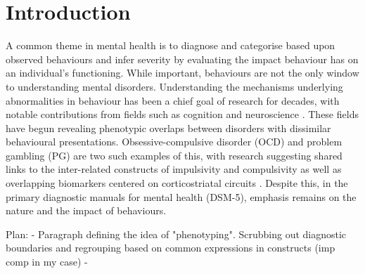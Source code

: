 \section{Introduction}

A common theme in mental health is to diagnose and categorise based upon observed behaviours and infer severity by evaluating the impact behaviour has on an individual's functioning. While important, behaviours are not the only window to understanding mental disorders. Understanding the mechanisms underlying abnormalities in behaviour has been a chief goal of research for decades, with notable contributions from fields such as cognition and neuroscience \cite{Frank_2015}. These fields have begun revealing phenotypic overlaps between disorders with dissimilar behavioural presentations. Obsessive-compulsive disorder (OCD) and problem gambling (PG) are two such examples of this, with research suggesting shared links to the inter-related constructs of impulsivity and compulsivity \cite{Tavares_2007} as well as overlapping biomarkers centered on corticostriatal circuits \cite{van_Holst_2010,Harrison_2009,Harrison_2013}. Despite this, in the primary diagnostic manuals for mental health (DSM-5), emphasis remains on the nature and the impact of behaviours.

Plan:
- Paragraph defining the idea of "phenotyping". Scrubbing out diagnostic boundaries and regrouping based on common expressions in constructs (imp comp in my case)
- 



